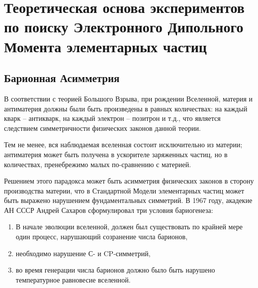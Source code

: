 \documentclass{report}
\begin{document}
\singlespacing


\tableofcontents 
\pagebreak

\onehalfspacing

\chapter{Теоретическая основа экспериментов по поиску Электронного Дипольного Момента элементарных частиц}
\newcommand{\dotprod}[2]{\; {#1} \cdot {#2}\;}
\newcommand{\xprod}[2]{{#1} \times {#2}}
\newcommand{\tensprod}[2]{#1 \otimes #2}
\newcommand{\SMatrix}{\mathcal{S}}
\newcommand{\TMatrix}{\mathcal{T}}
\newcommand{\IMatrix}{\mathcal{I}}

\newcommand{\ampl}[2]{\langle #1 \vert #2 \rangle}
\newcommand{\ket}[1]{\vert{#1}\rangle}
\newcommand{\bra}[1]{\langle{#1}\vert}

\section{Барионная Асимметрия} 

В соответствии с теорией Большого Взрыва, при рождении Вселенной, материя и антиматерия должны были быть произведены в равных количествах: на каждый кварк -- антикварк, на каждый электрон -- позитрон и т.д., что является следствием симметричности физических законов данной теории.

Тем не менее, вся наблюдаемая вселенная состоит исключительно из материи; антиматерия может быть получена в ускорителе заряженных частиц, но в количествах, пренебрежимо малых по-сравнению с материей.

Решением этого парадокса может быть асимметрия физических законов в сторону производства материи, что в Стандартной Модели элементарных частиц может быть выражено нарушением фундаментальных симметрий. В 1967 году, акадекие АН СССР Андрей Сахаров сформулировал три условия бариогенеза:~\cite{Perepelitsa:Baryogenesis}
\begin{enumerate}
\item В начале эволюции вселенной, должен был существовать по крайней мере один процесс, нарушающий созранение числа барионов,
\item необходимо нарушение С- и CP-симметрий,
\item во время генерации числа барионов должно было быть нарушено температурное равновесие вселенной.
\end{enumerate}
\end{document}
